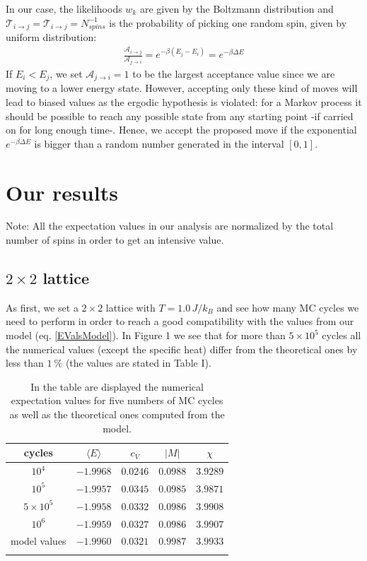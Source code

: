 \documentclass[%
 reprint,
 amsmath,amssymb,
 aps,
]{revtex4-1}
\theoremstyle{plain}
\theoremstyle{definition}
\theoremstyle{plain}
\newcommand{\mean}[1]{\langle #1\rangle}
\begin{document}
	In our case, the likelihoods $w_k$ are given by the Boltzmann distribution and $\mathscr{T}_{i \rightarrow j}=\mathscr{T}_{i \rightarrow j}=N_{spins}^{-1}$ is the probability of picking one random spin, given by uniform distribution:
	\begin{align*}
	\frac{\mathscr{A}_{i \rightarrow j}}{\mathscr{A}_{j \rightarrow i}}=e^{-\beta(E_j-E_i)}=e^{-\beta\Delta E}
	\end{align*}
	If $E_i<E_j$, we set $\mathscr{A}_{j \rightarrow i}=1$ to be the largest acceptance value since we are moving to a lower energy state. However, accepting only these kind of moves will lead to biased values as the ergodic hypothesis is violated: for a Markov process it should be possible to reach any possible state from any starting point -if carried on for long enough time-. Hence, we accept the proposed move if the exponential $e^{-\beta\Delta E}$ is bigger than a random number generated in the interval $[0,1]$.
		
\section{Our results}
Note: All the expectation values in our analysis are normalized by the total number of spins in order to get an intensive value.
\subsection{$2\times2$ lattice}
As first, we set a $2\times2$ lattice with $T=1.0\,J/k_B$ and see how many MC cycles we need to perform in order to reach a good compatibility with the values from our model (eq. \ref{EValsModel}). In Figure 1 we see that for more than $5\times10^5$ cycles all the numerical values (except the specific heat) differ from the theoretical ones by less than $\SI{1}{\percent}$ (the values are stated in Table I). 

\begin{table}[h!]
		\label{tab:evals}
		\caption{In the table are displayed the numerical expectation values for five numbers of MC cycles as well as the theoretical ones computed from the model.}
\begin{tabular}{ccccc}
		\toprule
		cycles & $\mean{E}$ & $c_V$ & $|M|$ & $\chi$ \\
		\midrule
		$10^4$ & $-1.9968$ & $0.0246$ & $0.0988$ & $3.9289$ \\
		$10^5$ & $-1.9957$ & $0.0345$ & $0.0985$ & $3.9871$ \\
		$5\times10^5$ & $-1.9958$ & $0.0332$ & $0.0986$ & $3.9908$ \\
		$10^6$ & $-1.9959$ & $0.0327$ & $0.0986$ & $3.9907$ \\
		\midrule
		model values & $-1.9960$ & $0.0321$ & $0.9987$ & $3.9933$\\
		\colrule
\end{tabular}
\end{table}
\end{document}
